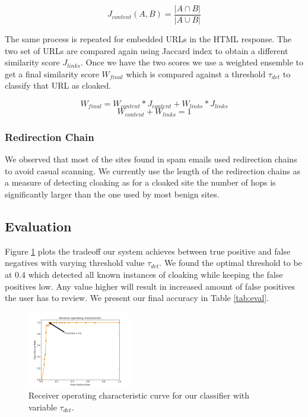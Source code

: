 \documentclass[letterpaper,twocolumn,10pt]{article}
\begin{document}
\begin{equation}
J_{content}(A, B) = \frac{|A \cap B|}{|A \cup B|}
\end{equation}

The same process is repeated for embedded URLs in the HTML response. The two set of URLs are compared again using Jaccard index to obtain a different similarity score $J_{links}$. Once we have the two scores we use a weighted ensemble to get a final similarity score $W_{final}$ which is compared against a threshold $\tau_{det}$ to classify that URL as cloaked.


\begin{equation}
W_{final} =  W_{content} * J_{content} + W_{links} * J_{links}
\end{equation}
\begin{equation}
W_{content} + W_{links}  =   1
\end{equation}

\subsubsection{Redirection Chain}
We observed that most of the sites found in spam emails used redirection chains to avoid casual scanning. We currently use the length of the redirection chains as a measure of detecting cloaking as for a cloaked site the number of hops is significantly larger than the one used by most benign sites.

\subsection{Evaluation}
Figure \ref{fig:roc} plots the tradeoff our system achieves between true positive and false negatives with varying threshold value $\tau_{det}$. We found the optimal threshold to be at $0.4$ which detected all known instances of cloaking while keeping the false positives low. Any value higher will result in increased amount of false positives the user has to review. We present our final accuracy in Table \ref{tab:eval}.

\begin{figure}[ht]
  \centering
  \includegraphics[width=0.4\textwidth]{./proj-roc.png}
  \caption{Receiver operating characteristic curve for our classifier with variable $\tau_{det}$.}
  \label{fig:roc}
\end{figure}
\end{document}
